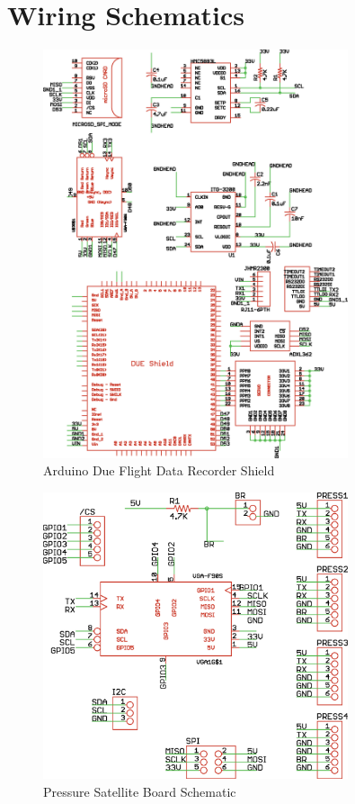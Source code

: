 \chapter{Wiring Schematics}

\begin{figure}[h!]
  \caption{Arduino Due Flight Data Recorder Shield} \label{thesisSchematic}
  \centering
    \includegraphics[width=0.8\textwidth]{figures/thesisSchematic.eps}
\end{figure}
\newpage
\begin{figure}[h!]
  \caption{Pressure Satellite Board Schematic} \label{satelliteSchematic}
  \centering
    \includegraphics[width=0.8\textwidth]{figures/satellite.eps}
\end{figure}

